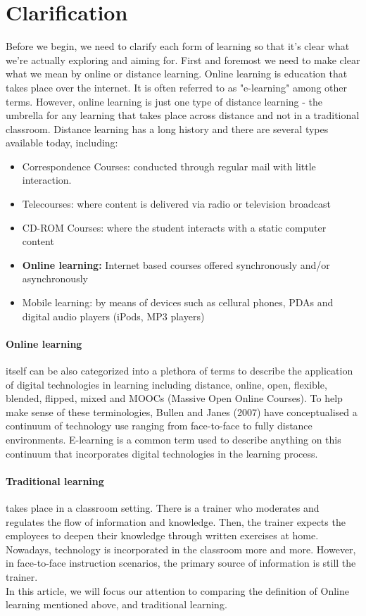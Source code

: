 \documentclass[10pt,twoside,slovak,a4paper]{article}
\begin{document}
\section{Clarification}
Before we begin, we need to clarify each form of learning so that it's clear what we're actually exploring and aiming for. First and foremost we need to make clear what we mean by online or distance learning. Online learning is education that takes place over the internet. It is often referred to as "e-learning" among other terms. However, online learning is just one type of distance learning - the umbrella for any learning that takes place across distance and not in a traditional classroom. Distance learning has a long history and there are several types available today, including:\cite{introductiontoonlinelearning}
\begin{itemize}
    \item Correspondence Courses: conducted through regular mail with little interaction.
    \item Telecourses: where content is delivered via radio or television broadcast
    \item CD-ROM Courses: where the student interacts with a static computer content
    \item \textbf{Online learning:} Internet based courses offered synchronously and/or asynchronously
    \item Mobile learning: by means of devices such as cellural phones, PDAs and digital audio players (iPods, MP3 players) 
    
\end{itemize}
\paragraph{Online learning} itself can be also categorized into a plethora of terms to describe the application of digital technologies in learning including distance, online, open, flexible, blended, flipped, mixed and MOOCs (Massive Open Online Courses).\cite{inbook} 
To help make sense of these terminologies, Bullen and Janes (2007)\cite{Bullen} have conceptualised a continuum of technology use ranging from face-to-face to fully distance environments. E-learning is a common term used to describe anything on this continuum that incorporates digital technologies in the learning process\cite{Nichols}.\\
\paragraph{Traditional learning} takes place in a classroom setting. There is a trainer who moderates and regulates the flow of information and knowledge. Then, the trainer expects the employees to deepen their knowledge through written exercises at home. Nowadays, technology is incorporated in the classroom more and more. However, in face-to-face instruction scenarios, the primary source of information is still the trainer.\cite{traditionallearning} \\
In this article, we will focus our attention to comparing the definition of Online learning mentioned above, and traditional learning.
\end{document}
